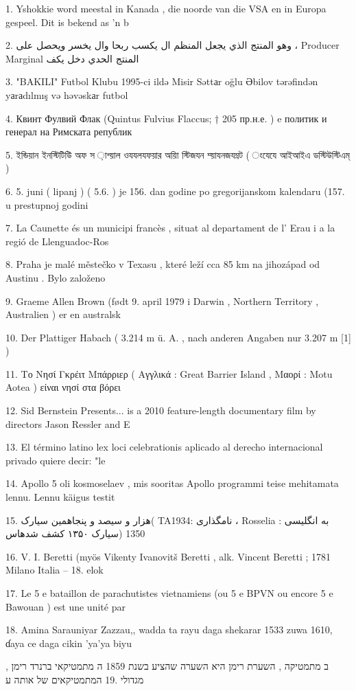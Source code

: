 1. Yshokkie word meestal in Kanada , die noorde van die VSA en in Europa gespeel. Dit
is bekend as 'n b

2. وهو المنتج الذي يجعل المنظم ال يكسب ربحا وال يخسر ويحصل على ، Producer Marginal المنتج الحدي دخل يكف

3. "BAKILI" Futbol Klubu 1995-ci ildə Misir Səttаr oğlu Əbilov tərəfindən yаrаdılmış və
həvəskаr futbol

4. Квинт Фулвий Флак (Quintus Fulvius Flaccus; † 205 пр.н.е. ) e политик и генерал на
Римската републик

5. ইন্ডিয়ান ইনস্টিটিউি অফ স ়াশ্য়াল ওযযলযফয়ার অয়াি স্টিজযন ম্য়াযনজযম্ন্ট
( ংযেযে আইআইএ ডস্টিউস্টিএম্ )

6. 5. juni ( lipanj ) ( 5.6. ) je 156. dan godine po gregorijanskom kalendaru (157. u
prestupnoj godini

7. La Caunette és un municipi francès , situat al departament de l' Erau i a la regió de
Llenguadoc-Ros

8. Praha je malé městečko v Texasu , které leží cca 85 km na jihozápad od Austinu . Bylo
založeno

9. Graeme Allen Brown (født 9. april 1979 i Darwin , Northern Territory , Australien ) er
en australsk

10. Der Plattiger Habach ( 3.214 m ü. A. , nach anderen Angaben nur 3.207 m [1] )

11. Το Νησί Γκρέιτ Μπάρριερ ( Αγγλικά : Great Barrier Island , Μαορί : Motu Aotea )
είναι νησί στα βόρει

12. Sid Bernstein Presents... is a 2010 feature-length documentary film by directors Jason
Ressler and E

13. El término latino lex loci celebrationis aplicado al derecho internacional privado quiere
decir: "le

14. Apollo 5 oli kosmoselaev , mis sooritas Apollo programmi teise mehitamata lennu.
Lennu käigus testit

15. هزار و سیصد و پنجاهمین سیارک( TAنامگذاری :1934 ، Rosselia به انگلیسی : 1350 (سیارک ۱۳۵۰ کشف شدهاس

16. V. I. Beretti (myös Vikenty Ivanovitš Beretti , alk. Vincent Beretti ; 1781 Milano Italia -- 18. elok

17. Le 5 e bataillon de parachutistes vietnamiens (ou 5 e BPVN ou encore 5 e Bawouan )
est une unité par

18. Amina Sarauniyar Zazzau,, wadda ta rayu daga shekarar 1533 zuwa 1610, ɗaya ce daga
cikin 'ya'ya biyu

ב מתמטיקה , השערת רימן היא השערה שהציע בשנת 1859 ה מתמטיקאי ברנרד רימן , מגדולי .19
המתמטיקאים של אותה ע

